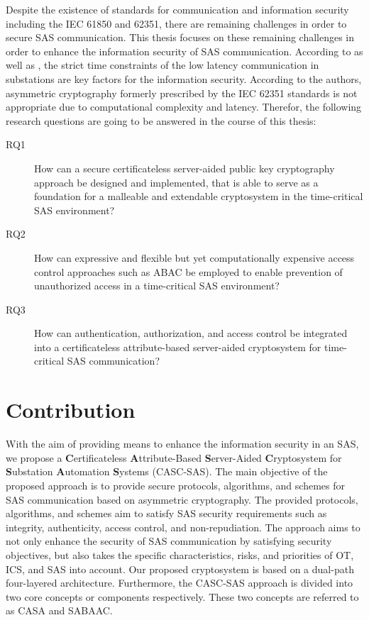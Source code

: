 Despite the existence of standards for communication and information security including the IEC 61850 and 62351, there are remaining challenges in order to secure SAS communication.
This thesis focuses on these remaining challenges in order to enhance the information security of SAS communication.
According to \citeauthor{Ishchenko2018} \cite{Ishchenko2018} as well as \citeauthor{Elbez2019} \cite{Elbez2019}, the strict time constraints of the low latency communication in substations are key factors for the information security.
According to the authors, asymmetric cryptography formerly prescribed by the IEC 62351 standards is not appropriate due to computational complexity and latency.
Therefor, the following research questions are going to be answered in the course of this thesis:
\begin{description}
    \item[RQ1] How can a secure certificateless server-aided public key cryptography approach be designed and implemented, that is able to serve as a foundation for a malleable and extendable cryptosystem in the time-critical SAS environment?
    \item[RQ2] How can expressive and flexible but yet computationally expensive access control approaches such as ABAC be employed to enable prevention of unauthorized access in a time-critical SAS environment?
    \item[RQ3] How can authentication, authorization, and access control be integrated into a certificateless attribute-based server-aided cryptosystem for time-critical SAS communication?
\end{description}

\section{Contribution}
\label{sec:introduction:contribution}
With the aim of providing means to enhance the information security in an SAS, we propose a \textbf{C}ertificateless \textbf{A}ttribute-Based \textbf{S}erver-Aided \textbf{C}ryptosystem for \textbf{S}ubstation \textbf{A}utomation \textbf{S}ystems (CASC-SAS).
The main objective of the proposed approach is to provide secure protocols, algorithms, and schemes for SAS communication based on asymmetric cryptography.
The provided protocols, algorithms, and schemes aim to satisfy SAS security requirements such as integrity, authenticity, access control, and non-repudiation.
The approach aims to not only enhance the security of SAS communication by satisfying security objectives, but also takes the specific characteristics, risks, and priorities of OT, ICS, and SAS into account.
Our proposed cryptosystem is based on a dual-path four-layered architecture.
Furthermore, the CASC-SAS approach is divided into two core concepts or components respectively.
These two concepts are referred to as CASA and SABAAC.

